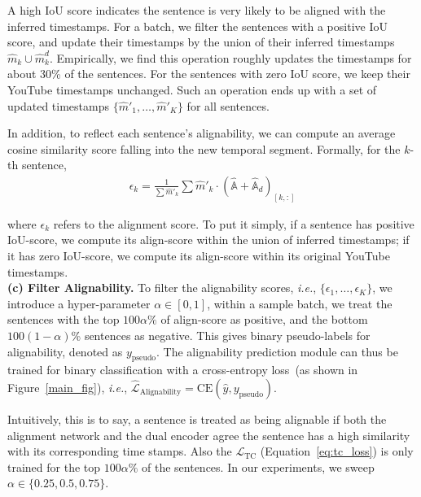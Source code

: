 \noindent 
A high IoU score indicates the sentence is very likely to be 
aligned with the inferred timestamps.
For a batch, we filter the sentences with a positive IoU score,
and update their timestamps by the union of their inferred timestamps $\hat{m}_{k} \cup \hat{m}^d_{k}$. 
Empirically, we find this operation roughly updates the timestamps for about 30\% of the sentences.
For the sentences with zero IoU score, 
we keep their YouTube timestamps unchanged.
Such an operation ends up with a set of updated timestamps 
$\{\hat{m}'_1, \dots, \hat{m}'_K\}$ for all sentences.

In addition, to reflect each sentence's alignability, 
we can compute an average cosine similarity score falling into the new temporal segment. Formally, for the $k$-th sentence,
\vspace{-2mm}
\begin{align}
\epsilon_k = \frac{1}{\sum{\hat{m}'_k}}
                       \sum{\hat{m}'_k\cdot (\hat{\mathbb{A}}+\hat{\mathbb{A}}_d)_{[k,:]}} 
\end{align}
\vspace{-4mm}

\noindent where $\epsilon_k$ refers to the alignment score.
To put it simply, if a sentence has positive IoU-score,
we compute its align-score within the union of inferred timestamps;
if it has zero IoU-score, we compute its align-score within its original YouTube timestamps.\\[-4pt]

\vspace{-2mm}
\noindent \textbf{(c) Filter Alignability. }
To filter the alignability scores,
{\em i.e.}, $\{\epsilon_1, \dots, \epsilon_K\}$,
we introduce a hyper-parameter $\alpha \in [0,1]$,
within a sample batch, we treat the sentences with the top $100\alpha\%$ of align-score as positive, 
and the bottom $100(1-\alpha)$\% sentences as negative.
This gives binary pseudo-labels for alignability, denoted as $y_{\text{pseudo}}$.
The alignability prediction module can thus be trained for binary classification
with a cross-entropy loss~(as shown in Figure~\ref{main_fig}), 
{\em i.e.}, $\hat{\mathcal{L}}_{\text{Alignability}} = \text{CE}(\hat{y}, y_{\text{pseudo}})$.

Intuitively, this is to say, 
a sentence is treated as being alignable 
if both the alignment network and the dual encoder agree the sentence 
has a high similarity with its corresponding time stamps.
Also the $\mathcal{L}_\text{TC}$ (Equation~\ref{eq:tc_loss})
is only trained for the top $100\alpha\%$ of the sentences. 
In our experiments, we sweep $\alpha\in\{0.25, 0.5, 0.75\}$.

